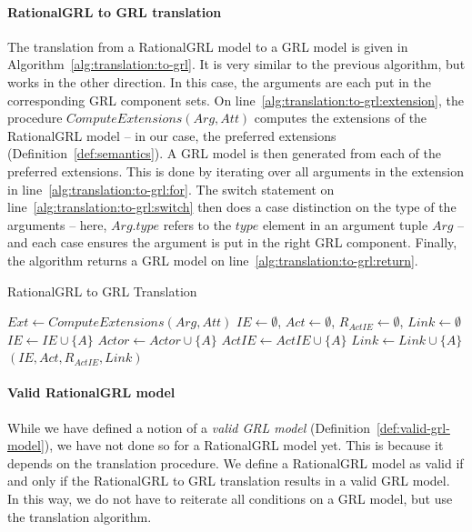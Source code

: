 \paragraph{RationalGRL to GRL translation} The translation from a RationalGRL model to a GRL model is given in Algorithm~\ref{alg:translation:to-grl}. It is very similar to the previous algorithm, but works in the other direction. In this case, the arguments are each put in the corresponding GRL component sets. On line~\ref{alg:translation:to-grl:extension}, the procedure $ComputeExtensions(Arg,Att)$ computes the extensions of the RationalGRL model -- in our case, the preferred extensions (Definition~\ref{def:semantics}). A GRL model is then generated from each of the preferred extensions. This is done by iterating over all arguments in the extension in line~\ref{alg:translation:to-grl:for}. The switch statement on line~\ref{alg:translation:to-grl:switch} then does a case distinction on the type of the arguments -- here, $Arg.type$ refers to the $type$ element in an argument tuple $Arg$ -- and each case ensures the argument is put in the right GRL component. Finally, the algorithm returns a GRL model on line~\ref{alg:translation:to-grl:return}.

\begin{algorithm}[b]
  \caption{RationalGRL to GRL Translation}
  \label{alg:translation:to-grl}
  \begin{algorithmic}[1]
    \State $Ext \leftarrow ComputeExtensions(Arg,Att)$\label{alg:translation:to-grl:extension}
    \State $IE\leftarrow\emptyset$, $Act\leftarrow\emptyset$, $R_{ActIE}\leftarrow\emptyset$, $Link\leftarrow \emptyset$
    \label{alg:translation:to-grl:for}
      \label{alg:translation:to-grl:switch}
            \State $IE\leftarrow IE\cup \{A\}$
          \EndCase
            \State $Actor\leftarrow Actor\cup \{A\}$
          \EndCase
            \State $ActIE\leftarrow ActIE\cup \{A\}$
          \EndCase
            \State $Link\leftarrow Link \cup\{A\}$
          \EndCase
      \EndSwitch
    \EndFor
    \State \Return $(IE,Act,R_{ActIE}, Link)$\label{alg:translation:to-grl:return}
    \EndFor
    \EndProcedure
  \end{algorithmic}
\end{algorithm}

\paragraph{Valid RationalGRL model} While we have defined a notion of a \emph{valid GRL model} (Definition~\ref{def:valid-grl-model}), we have not done so for a RationalGRL model yet. This is because it depends on the translation procedure. We define a RationalGRL model as valid if and only if the RationalGRL to GRL translation results in a valid GRL model. In this way, we do not have to reiterate all conditions on a GRL model, but use the translation algorithm.

